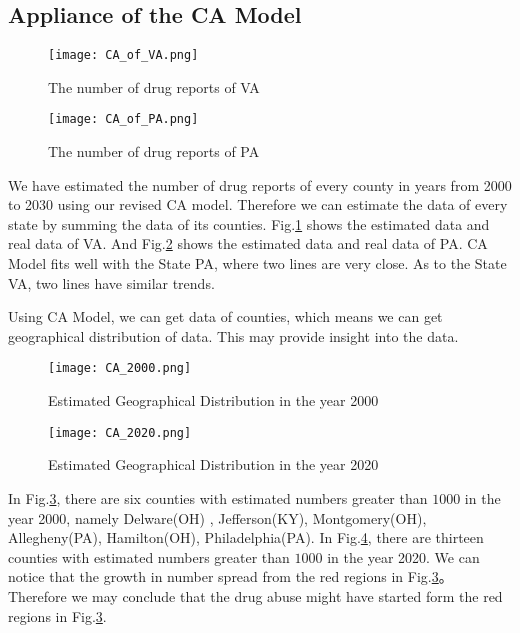 \documentclass{mcmthesis}
\begin{document}
\subsection{Appliance of the CA Model}

\begin{figure}[h]
\small
\centering
\texttt{[image: CA\_of\_VA.png]}
\caption{The number of drug reports of VA} \label{fig:CA_of_VA}
\end{figure}

\begin{figure}[h]
\small
\centering
\texttt{[image: CA\_of\_PA.png]}
\caption{The number of drug reports of PA} \label{fig:CA_of_PA}
\end{figure}

  We have estimated the number of drug reports of every county in years from 2000 to 2030 using our revised CA model. Therefore we can estimate the data of every state by summing the data of its counties. Fig.\ref{fig:CA_of_VA} shows the estimated data and real data of VA. And Fig.\ref{fig:CA_of_PA} shows the estimated data and real data of PA. CA Model fits well with the State PA, where two lines are very close. As to the State VA, two lines have similar trends.\par
  Using CA Model, we can get data of counties, which means we can get geographical distribution of data. This may provide insight into the data. 
\begin{figure}[h]
\small
\centering
\texttt{[image: CA\_2000.png]}
\caption{Estimated Geographical Distribution in the year 2000} \label{fig:CA_2000}
\end{figure}

\begin{figure}[h]
\small
\centering
\texttt{[image: CA\_2020.png]}
\caption{Estimated Geographical Distribution in the year 2020} \label{fig:CA_2020}
\end{figure}

In Fig.\ref{fig:CA_2000}, there are six counties with estimated numbers greater than $1000$ in the year 2000, namely Delware(OH)  , Jefferson(KY), Montgomery(OH), Allegheny(PA), Hamilton(OH), Philadelphia(PA). In Fig.\ref{fig:CA_2020}, there are thirteen counties with estimated numbers greater than $1000$ in the year 2020. We can notice that the growth in number spread from the red regions in Fig.\ref{fig:CA_2000}。 Therefore we may conclude that the drug abuse might have started form the red regions in Fig.\ref{fig:CA_2000}.
\end{document}
